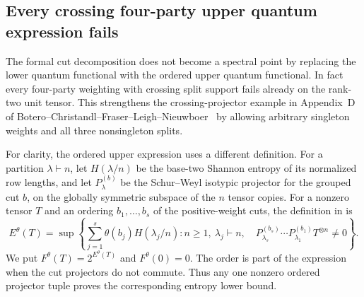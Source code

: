 \subsection{Every crossing four-party upper quantum expression fails}
The formal cut decomposition does not become a spectral point by replacing the lower quantum functional with the ordered upper quantum functional.  In fact every four-party weighting with crossing split support fails already on the rank-two unit tensor.  This strengthens the crossing-projector example in Appendix~D of Botero--Christandl--Fraser--Leigh--Nieuwboer~\cite{bcfln-quantum} by allowing arbitrary singleton weights and all three nonsingleton splits.

For clarity, the ordered upper expression uses a different definition.
For a partition $\lambda\vdash n$, let $H(\lambda/n)$ be the base-two
Shannon entropy of its normalized row lengths, and let
$P^{(b)}_\lambda$ be the Schur--Weyl isotypic projector for the grouped
cut $b$, on the globally symmetric subspace of the $n$ tensor copies.
For a nonzero tensor $T$ and an ordering $b_1,\ldots,b_s$ of the
positive-weight cuts, the definition in
\cite[Definition 3.3]{cvz-universal} is
\[
 E^\theta(T)=\sup\left\{
   \sum_{j=1}^s\theta(b_j)H(\lambda_j/n):
   n\geq1,\ \lambda_j\vdash n,\quad
   P^{(b_s)}_{\lambda_s}\cdots P^{(b_1)}_{\lambda_1}
   T^{\otimes n}\ne0\right\}.
\]
We put $F^\theta(T)=2^{E^\theta(T)}$ and $F^\theta(0)=0$.
The order is part of the expression when the cut projectors do not
commute. Thus any one nonzero ordered projector tuple proves the
corresponding entropy lower bound.

